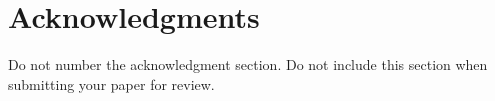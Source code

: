 \documentclass[11pt,letterpaper]{article}
\begin{document}
%
%
%
%
%

\section*{Acknowledgments}

Do not number the acknowledgment section. Do not include this section when submitting your paper for review.


\end{document}
